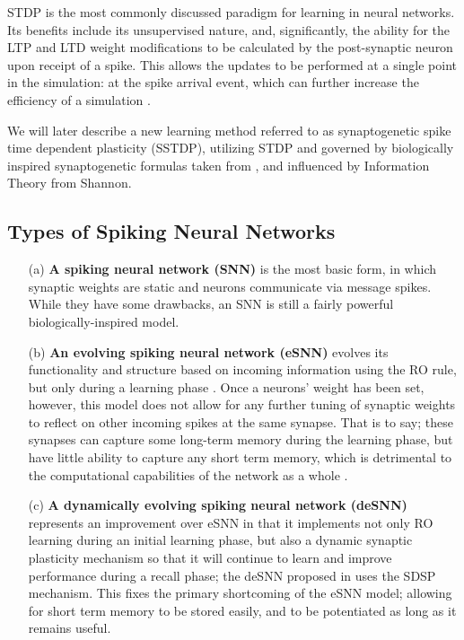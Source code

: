 \documentclass[journal]{./sty/IEEEtran}
\begin{document}
STDP is the most commonly discussed paradigm for learning in neural networks. Its benefits include its unsupervised nature, and, significantly, the ability for the LTP and LTD weight modifications to be calculated by the post-synaptic neuron upon receipt of a spike. This allows the updates to be performed at a single point in the simulation: at the spike arrival event, which can further increase the efficiency of a simulation \cite{FBBPSTDP:Davies,FBSTDP:Davies}.

We will later describe a new learning method referred to as synaptogenetic spike time dependent plasticity (SSTDP), utilizing STDP and governed by biologically inspired synaptogenetic formulas taken from \cite{SynGen:Levy}, and influenced by Information Theory from Shannon.

\subsection{Types of Spiking Neural Networks}
\begin{itemize}
\item[(a)] {\bf A spiking neural network (SNN)} is the most basic form, 
in which synaptic weights are static and neurons communicate via message spikes.
While they have some drawbacks, an SNN is still a fairly powerful biologically-inspired model.
\item[(b)] {\bf An evolving spiking neural network (eSNN)} evolves its functionality and 
structure based on incoming information using the RO rule, 
but only during a learning phase \cite{deSNN:Kasabov}.
Once a neurons' weight has been set, however, this model does not allow 
for any further tuning of synaptic weights to reflect on other incoming spikes at the same synapse. 
That is to say; these synapses can capture some long-term memory during the learning phase, 
but have little ability to capture any short term memory, which is detrimental to the computational 
capabilities of the network as a whole \cite{deSNN:Kasabov}.
\item[(c)] {\bf A dynamically evolving spiking neural network (deSNN)} represents an improvement 
over eSNN in that it implements not only RO learning during an initial learning phase, 
but also a dynamic synaptic plasticity mechanism so that it will continue to learn and 
improve performance during a recall phase; the deSNN proposed in \cite{deSNN:Kasabov} 
uses the SDSP mechanism. 
This fixes the primary shortcoming of the eSNN model; 
allowing for short term memory to be stored easily, 
and to be potentiated as long as it remains useful\cite{deSNN:Kasabov}. 
\end{itemize}
\end{document}
